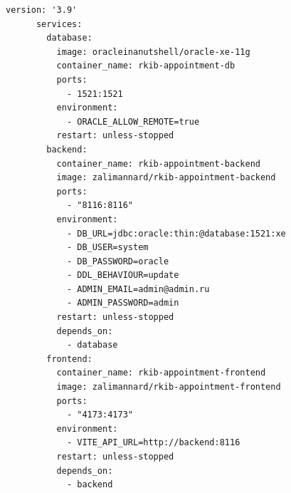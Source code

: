 \documentclass[a4paper,article]{article}
\begin{document}
\begin{sloppypar}
\begin{appendices}
        \begin{lstlisting}[]
    version: '3.9'
      services:
        database:
          image: oracleinanutshell/oracle-xe-11g
          container_name: rkib-appointment-db
          ports:
            - 1521:1521
          environment:
            - ORACLE_ALLOW_REMOTE=true
          restart: unless-stopped
        backend:
          container_name: rkib-appointment-backend
          image: zalimannard/rkib-appointment-backend
          ports:
            - "8116:8116"
          environment:
            - DB_URL=jdbc:oracle:thin:@database:1521:xe
            - DB_USER=system
            - DB_PASSWORD=oracle
            - DDL_BEHAVIOUR=update
            - ADMIN_EMAIL=admin@admin.ru
            - ADMIN_PASSWORD=admin
          restart: unless-stopped
          depends_on:
            - database
        frontend:
          container_name: rkib-appointment-frontend
          image: zalimannard/rkib-appointment-frontend
          ports:
            - "4173:4173"
          environment:
            - VITE_API_URL=http://backend:8116
          restart: unless-stopped
          depends_on:
            - backend
        \end{lstlisting}
    \end{appendices}

\end{sloppypar}
\end{document}
